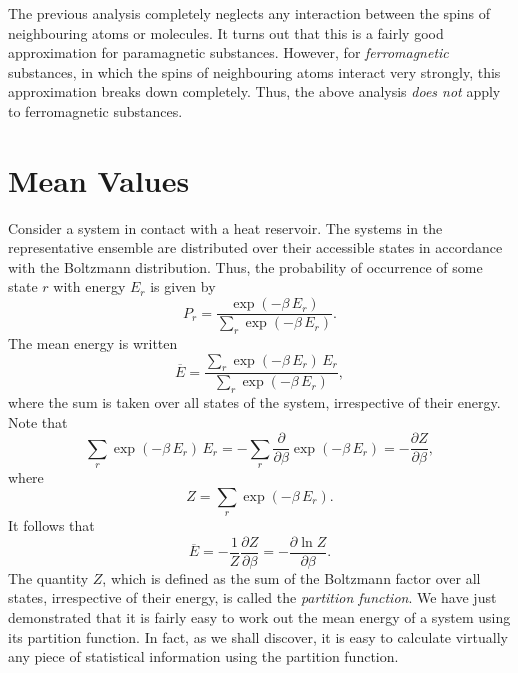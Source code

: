 The previous analysis completely neglects any interaction between the
spins of neighbouring atoms or molecules. It turns out that this is
a fairly good approximation for paramagnetic substances. However, for
{\em ferromagnetic}\/ substances, in which the spins of neighbouring atoms
interact very strongly, this approximation breaks down completely. Thus, the
above analysis {\em does not} apply to ferromagnetic substances. 

\section{Mean Values}
Consider a
system in contact with a heat reservoir. The systems in the representative
ensemble are distributed over their accessible states in accordance with the
Boltzmann distribution.
Thus, the probability  of occurrence of some state $r$ with energy $E_r$
 is given by
\begin{equation}
P_r = \frac{\exp(-\beta\,E_r)}{\sum_r \exp(-\beta \,E_r)}.
\end{equation}
The mean energy is written
\begin{equation}
\overline{E} = \frac{\sum_r \exp(-\beta\, E_r)\, E_r}{\sum_r \exp(-\beta\, E_r)},
\end{equation}
where the sum is taken over all states of the system,
irrespective of their energy. Note that 
\begin{equation}
\sum_r \exp(-\beta \,E_r)\,E_r = -\sum_r \frac{\partial}{\partial \beta}
\exp(-\beta\, E_r)
= -\frac{\partial Z}{\partial \beta},
\end{equation}
where
\begin{equation}
Z = \sum_r \exp(-\beta \,E_r).
\end{equation}
It follows that
\begin{equation}
\overline{E} = - \frac{1}{Z} \frac{\partial Z}{\partial \beta} = - \frac{
\partial \ln Z}{\partial \beta}.\label{e7.35}
\end{equation}
The quantity $Z$, which is defined as the sum of the Boltzmann factor over all 
states, irrespective of their energy,
is called the {\em partition function}. 
We have just demonstrated that it is fairly  easy to work out the
mean energy of a system using its  partition function. In fact, as we shall
discover, it is easy
to calculate virtually any piece of statistical information using the partition
function. 

